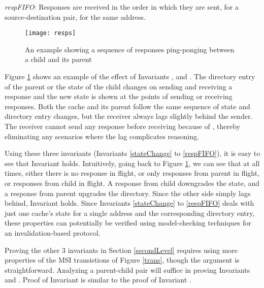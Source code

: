 \begin{inv}
\textit{respFIFO}: Responses are received in the order in which they are sent,
for a source-destination pair, for the same address.
\label{respFIFO}
\end{inv}

\begin{figure}
\centering
\texttt{[image: resps]}
\caption{An example showing a sequence of responses ping-ponging between a child and its parent
}
\label{resps}
\end{figure}

Figure \ref{resps} shows an example of the effect of Invariants
,  and . The directory
entry of the parent or the state of the child changes on sending and receiving
a response and the new state is shown at the points of sending or receiving
responses.
Both the cache and its parent follow the same sequence of state and directory
entry changes, but the receiver always lags slightly behind the sender.
The receiver cannot send any response before receiving because of
, thereby eliminating any scenarios where the lag complicates
reasoning.

Using these three invariants (Invariants \ref{stateChange} to \ref{respFIFO}), it
is easy to see that Invariant  holds. Intuitively, going
back to Figure \ref{resps}, we can see that at all times, either there is no
response in flight, or only responses from parent in flight, or responses from
child in flight. A response from child downgrades the state, and a response from
parent upgrades the directory. Since the other side simply lags behind,
Invariant  holds. Since Invariants \ref{stateChange} to
\ref{respFIFO} deals with just one cache's state for a single address and the
corresponding directory entry, these properties can potentially be verified
using model-checking techniques for an invalidation-based protocol.

Proving the other 3 invariants in Section \ref{secondLevel} requires using
more properties of the MSI transistions of Figure \ref{trans}, though the argument is
straightforward. Analyzing a parent-child pair will suffice in proving Invariants
 and . Proof of Invariant
 is similar to the proof of Invariant
.

